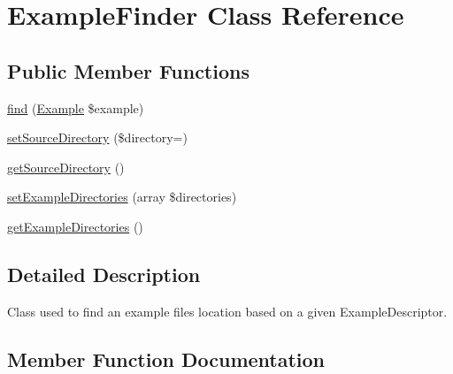 \hypertarget{classphp_documentor_1_1_reflection_1_1_doc_block_1_1_example_finder}{}\section{Example\+Finder Class Reference}
\label{classphp_documentor_1_1_reflection_1_1_doc_block_1_1_example_finder}
\subsection*{Public Member Functions}
\begin{DoxyCompactItemize}
\item 
\mbox{\hyperlink{classphp_documentor_1_1_reflection_1_1_doc_block_1_1_example_finder_acedcb691ca4cc7e2f7e0fdd6454c6019}{find}} (\mbox{\hyperlink{classphp_documentor_1_1_reflection_1_1_doc_block_1_1_tags_1_1_example}{Example}} \$example)
\item 
\mbox{\hyperlink{classphp_documentor_1_1_reflection_1_1_doc_block_1_1_example_finder_aa9d694d13ba72977999484018447b525}{set\+Source\+Directory}} (\$directory=\textquotesingle{}\textquotesingle{})
\item 
\mbox{\hyperlink{classphp_documentor_1_1_reflection_1_1_doc_block_1_1_example_finder_ae6d05098713694a962ab7820798df840}{get\+Source\+Directory}} ()
\item 
\mbox{\hyperlink{classphp_documentor_1_1_reflection_1_1_doc_block_1_1_example_finder_a912f066879aa96182818c533580e1dbc}{set\+Example\+Directories}} (array \$directories)
\item 
\mbox{\hyperlink{classphp_documentor_1_1_reflection_1_1_doc_block_1_1_example_finder_ab902c67cd47123f4d96b3b35f55b60db}{get\+Example\+Directories}} ()
\end{DoxyCompactItemize}


\subsection{Detailed Description}
Class used to find an example file\textquotesingle{}s location based on a given Example\+Descriptor. 

\subsection{Member Function Documentation}
\mbox{\label{classphp_documentor_1_1_reflection_1_1_doc_block_1_1_example_finder_acedcb691ca4cc7e2f7e0fdd6454c6019}} 
